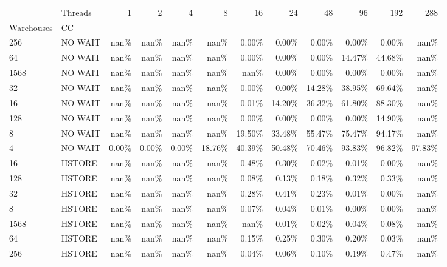 \begin{tabular}{llrrrrrrrrrr}
\toprule
     & Threads &   1   &   2   &   4   &    8   &    16  &    24  &    48  &    96  &    192 &    288 \\
Warehouses & CC &       &       &       &        &        &        &        &        &        &        \\
\midrule
256  & NO WAIT &  nan\% &  nan\% &  nan\% &   nan\% &  0.00\% &  0.00\% &  0.00\% &  0.00\% &  0.00\% &   nan\% \\
64   & NO WAIT &  nan\% &  nan\% &  nan\% &   nan\% &  0.00\% &  0.00\% &  0.00\% & 14.47\% & 44.68\% &   nan\% \\
1568 & NO WAIT &  nan\% &  nan\% &  nan\% &   nan\% &   nan\% &  0.00\% &  0.00\% &  0.00\% &  0.00\% &   nan\% \\
32   & NO WAIT &  nan\% &  nan\% &  nan\% &   nan\% &  0.00\% &  0.00\% & 14.28\% & 38.95\% & 69.64\% &   nan\% \\
16   & NO WAIT &  nan\% &  nan\% &  nan\% &   nan\% &  0.01\% & 14.20\% & 36.32\% & 61.80\% & 88.30\% &   nan\% \\
128  & NO WAIT &  nan\% &  nan\% &  nan\% &   nan\% &  0.00\% &  0.00\% &  0.00\% &  0.00\% & 14.90\% &   nan\% \\
8    & NO WAIT &  nan\% &  nan\% &  nan\% &   nan\% & 19.50\% & 33.48\% & 55.47\% & 75.47\% & 94.17\% &   nan\% \\
4    & NO WAIT & 0.00\% & 0.00\% & 0.00\% & 18.76\% & 40.39\% & 50.48\% & 70.46\% & 93.83\% & 96.82\% & 97.83\% \\
16   & HSTORE &  nan\% &  nan\% &  nan\% &   nan\% &  0.48\% &  0.30\% &  0.02\% &  0.01\% &  0.00\% &   nan\% \\
128  & HSTORE &  nan\% &  nan\% &  nan\% &   nan\% &  0.08\% &  0.13\% &  0.18\% &  0.32\% &  0.33\% &   nan\% \\
32   & HSTORE &  nan\% &  nan\% &  nan\% &   nan\% &  0.28\% &  0.41\% &  0.23\% &  0.01\% &  0.00\% &   nan\% \\
8    & HSTORE &  nan\% &  nan\% &  nan\% &   nan\% &  0.07\% &  0.04\% &  0.01\% &  0.00\% &  0.00\% &   nan\% \\
1568 & HSTORE &  nan\% &  nan\% &  nan\% &   nan\% &   nan\% &  0.01\% &  0.02\% &  0.04\% &  0.08\% &   nan\% \\
64   & HSTORE &  nan\% &  nan\% &  nan\% &   nan\% &  0.15\% &  0.25\% &  0.30\% &  0.20\% &  0.03\% &   nan\% \\
256  & HSTORE &  nan\% &  nan\% &  nan\% &   nan\% &  0.04\% &  0.06\% &  0.10\% &  0.19\% &  0.47\% &   nan\% \\

\end{tabular}
